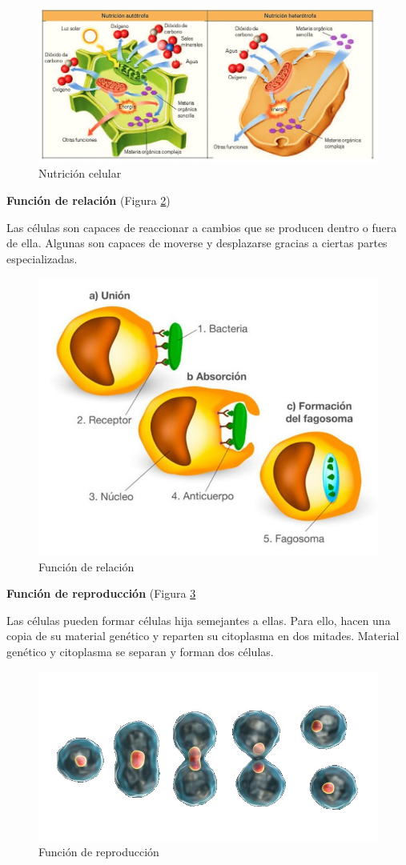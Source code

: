 \begin{figure}[!ht]
    \centering
    \includegraphics[width=0.8\linewidth]{Tema1/05_Nutricion_celular.jpg}
    \caption{Nutrición celular}
    \label{fig:nutricion-celular}
\end{figure}

\textbf{Función de relación} (Figura \ref{fig:relacion-celular})

Las células son capaces de reaccionar a cambios que se producen dentro o fuera de ella. Algunas son capaces de moverse y desplazarse gracias a ciertas partes especializadas.

\begin{figure}[!ht]
    \centering
    \includegraphics[width=0.5\linewidth]{Tema1/06_Relacion_celular.jpg}
    \caption{Función de relación}
    \label{fig:relacion-celular}
\end{figure}

\textbf{Función de reproducción} (Figura \ref{fig:reproduccion-celular}

Las células pueden formar células hija semejantes a ellas. Para ello, hacen una copia de su material genético y reparten su citoplasma en dos mitades. Material genético y citoplasma se separan y forman dos células.

\begin{figure}[!ht]
    \centering
    \includegraphics[width=0.6\linewidth]{Tema1/07_Reproduccion_celular.jpg}
    \caption{Función de reproducción}
    \label{fig:reproduccion-celular}
\end{figure}